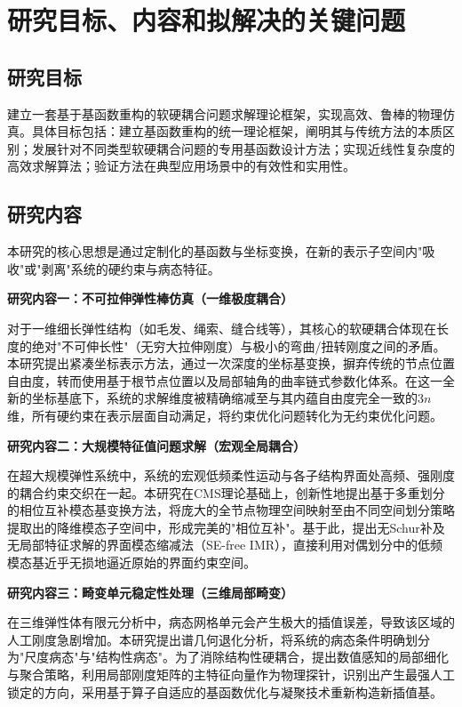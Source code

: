 
\section{研究目标、内容和拟解决的关键问题}

\subsection{研究目标}

建立一套基于基函数重构的软硬耦合问题求解理论框架，实现高效、鲁棒的物理仿真。具体目标包括：建立基函数重构的统一理论框架，阐明其与传统方法的本质区别；发展针对不同类型软硬耦合问题的专用基函数设计方法；实现近线性复杂度的高效求解算法；验证方法在典型应用场景中的有效性和实用性。

\subsection{研究内容}

本研究的核心思想是通过定制化的基函数与坐标变换，在新的表示子空间内"吸收"或"剥离"系统的硬约束与病态特征。

\textbf{研究内容一：不可拉伸弹性棒仿真（一维极度耦合）}

对于一维细长弹性结构（如毛发、绳索、缝合线等），其核心的软硬耦合体现在长度的绝对"不可伸长性"（无穷大拉伸刚度）与极小的弯曲/扭转刚度之间的矛盾。本研究提出紧凑坐标表示方法，通过一次深度的坐标基变换，摒弃传统的节点位置自由度，转而使用基于根节点位置以及局部轴角的曲率链式参数化体系。在这一全新的坐标基底下，系统的求解维度被精确缩减至与其内蕴自由度完全一致的$3n$维，所有硬约束在表示层面自动满足，将约束优化问题转化为无约束优化问题。

\textbf{研究内容二：大规模特征值问题求解（宏观全局耦合）}

在超大规模弹性系统中，系统的宏观低频柔性运动与各子结构界面处高频、强刚度的耦合约束交织在一起。本研究在CMS理论基础上，创新性地提出基于多重划分的相位互补模态基变换方法，将庞大的全节点物理空间映射至由不同空间划分策略提取出的降维模态子空间中，形成完美的"相位互补"。基于此，提出无Schur补及无局部特征求解的界面模态缩减法（SE-free IMR），直接利用对偶划分中的低频模态基近乎无损地逼近原始的界面约束空间。

\textbf{研究内容三：畸变单元稳定性处理（三维局部畸变）}

在三维弹性体有限元分析中，病态网格单元会产生极大的插值误差，导致该区域的人工刚度急剧增加。本研究提出谱几何退化分析，将系统的病态条件明确划分为"尺度病态"与"结构性病态"。为了消除结构性硬耦合，提出数值感知的局部细化与聚合策略，利用局部刚度矩阵的主特征向量作为物理探针，识别出产生最强人工锁定的方向，采用基于算子自适应的基函数优化与凝聚技术重新构造新插值基。

